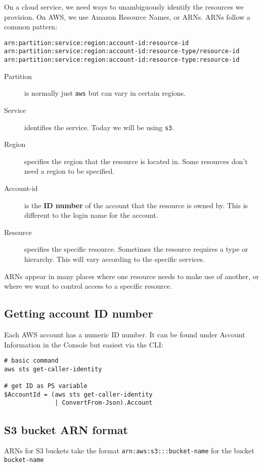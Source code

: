 \documentclass{pgnotes}
\begin{document}
On a cloud service, we need ways to unambiguously identify the resources we provision.
On AWS, we use Amazon Resource Names, or ARNs.
ARNs follow a common pattern:
\begin{verbatim}
arn:partition:service:region:account-id:resource-id
arn:partition:service:region:account-id:resource-type/resource-id
arn:partition:service:region:account-id:resource-type:resource-id
\end{verbatim}
\begin{description}
\item[Partition] is normally just \texttt{aws} but can vary in certain regions.
\item[Service] identifies the service.  Today we will be using \texttt{s3}.
\item[Region] specifies the region that the resource is located in. Some resources don't need a region to be specified.
\item[Account-id] is the \textbf{ID number} of the account that the resource is owned by. This is different to the login name for the account.
\item[Resource] specifies the specific resource. Sometimes the resource requires a type or hierarchy. This will vary according to the specific services.
\end{description}
ARNs appear in many places where one resource needs to make use of another, or where we want to control access to a specific resource.

\subsection{Getting account ID number}

Each AWS account has a numeric ID number.
It can be found under Account Information in the Console but easiest via the CLI: 
\begin{verbatim}
# basic command
aws sts get-caller-identity

# get ID as PS variable
$AccountId = (aws sts get-caller-identity 
              | ConvertFrom-Json).Account
\end{verbatim}

\subsection{S3 bucket ARN format}

ARNs for S3 buckets take the format \texttt{arn:aws:s3:::bucket-name} for the bucket \texttt{bucket-name}
\end{document}
